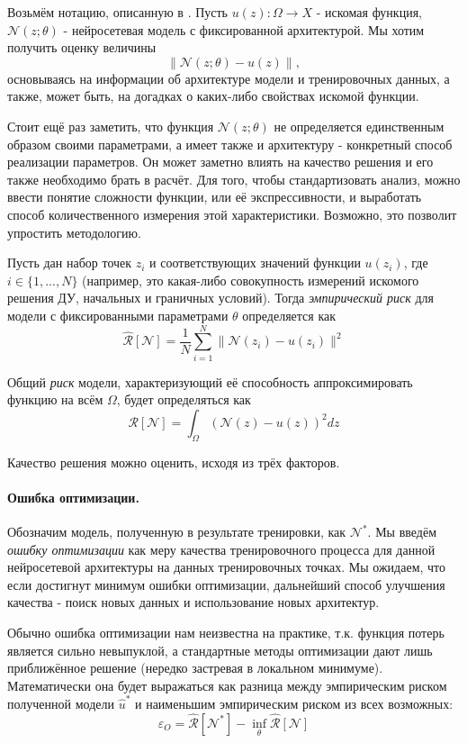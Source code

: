 \documentclass[a4paper, 12pt]{article}
\begin{document}
Возьмём нотацию, описанную в \cite{Cuomo2022}. Пусть $u(z) : \Omega \to X$ - искомая функция, $\mathcal{N}(z; \theta)$ - нейросетевая модель с фиксированной архитектурой. Мы хотим получить оценку величины
$$
\|\mathcal{N}(z; \theta) - u(z)\|,
$$
основываясь на информации об архитектуре модели и тренировочных данных, а также, может быть, на догадках о каких-либо свойствах искомой функции. 

Стоит ещё раз заметить, что функция $\mathcal{N}(z; \theta)$ не определяется единственным образом своими параметрами, а имеет также и архитектуру - конкретный способ реализации параметров. Он может заметно влиять на качество решения и его также необходимо брать в расчёт. Для того, чтобы стандартизовать анализ, можно ввести понятие сложности функции, или её экспрессивности, и выработать способ количественного измерения этой характеристики. Возможно, это позволит упростить методологию.

Пусть дан набор точек $z_i$ и соответствующих значений функции $u(z_i)$, где $i \in \{1, ..., N\}$ (например, это какая-либо совокупность измерений искомого решения ДУ, начальных и граничных условий). Тогда \textit{эмпирический риск} для модели с фиксированными параметрами $\theta$ определяется как
$$
\mathcal{\hat{R}}[\mathcal{N}] = \frac{1}{N}\sum_{i=1}^{N}\|\mathcal{N}(z_i) - u(z_i)\|^2
$$

Общий \textit{риск} модели, характеризующий её способность аппроксимировать функцию на всём $\Omega$, будет определяться как
$$
\mathcal{R}[\mathcal{N}] = \int_{\Omega}(\mathcal{N}(z) - u(z))^2dz
$$

Качество решения можно оценить, исходя из трёх факторов.

\paragraph{Ошибка оптимизации.} Обозначим модель, полученную в результате тренировки, как $\mathcal{N}^*$. Мы введём \textit{ошибку оптимизации} как меру качества тренировочного процесса для данной нейросетевой архитектуры на данных тренировочных точках. Мы ожидаем, что если достигнут минимум ошибки оптимизации, дальнейший способ улучшения качества - поиск новых данных и использование новых архитектур. 

Обычно ошибка оптимизации нам неизвестна на практике, т.к. функция потерь является сильно невыпуклой, а стандартные методы оптимизации дают лишь приближённое решение (нередко застревая в локальном минимуме). Математически она будет выражаться как разница между эмпирическим риском полученной модели $\hat{u}^*$ и наименьшим эмпирическим риском из всех возможных:
$$
\varepsilon_O = \mathcal{\hat{R}}[\mathcal{N}^*] - \inf_{\theta}\mathcal{\hat{R}}[\mathcal{N}]
$$
\end{document}
